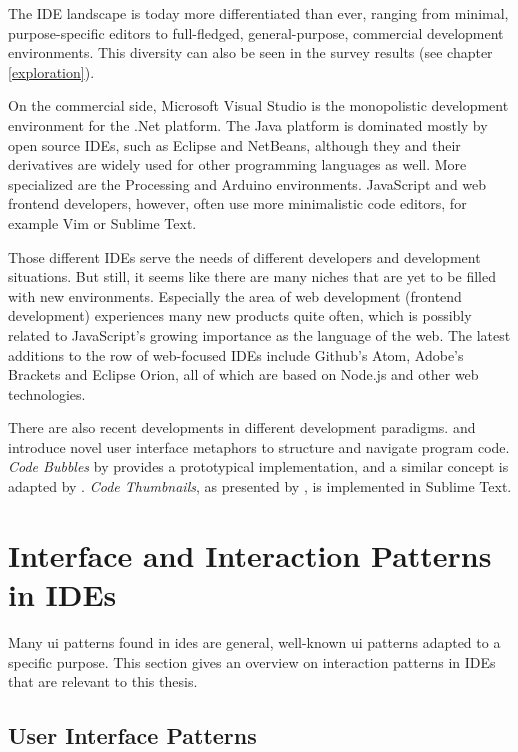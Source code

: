 The IDE landscape is today more differentiated than ever, ranging from
minimal, purpose-specific editors to full-fledged, general-purpose,
commercial development environments. This diversity can also be seen in
the survey results (see chapter \ref{exploration}).

On the commercial side, Microsoft Visual Studio is the monopolistic
development environment for the .Net platform. The Java platform is
dominated mostly by open source IDEs, such as Eclipse and NetBeans,
although they and their derivatives are widely used for other
programming languages as well. More specialized are the Processing and
Arduino environments. JavaScript and web frontend developers, however,
often use more minimalistic code editors, for example Vim or Sublime
Text.

Those different IDEs serve the needs of different developers and
development situations. But still, it seems like there are many niches
that are yet to be filled with new environments. Especially the area of
web development (frontend development) experiences many new products
quite often, which is possibly related to JavaScript’s growing
importance as the language of the web. The latest additions to the row
of web-focused IDEs include Github’s Atom, Adobe’s Brackets and Eclipse
Orion, all of which are based on Node.js and other web technologies.

There are also recent developments in different development paradigms.
 and  introduce novel user
interface metaphors to structure and navigate program code. \emph{Code
Bubbles} by  provides a prototypical implementation,
and a similar concept is adapted by . \emph{Code
Thumbnails}, as presented by , is implemented in
Sublime Text.

\section{Interface and Interaction Patterns in
IDEs}\label{interface-and-interaction-patterns-in-ides}

Many \acl{ui} patterns found in \glspl{ide} are general, well-known
\ac{ui} patterns adapted to a specific purpose. This section gives an
overview on interaction patterns in IDEs that are relevant to this
thesis.

\subsection{User Interface Patterns}\label{user-interface-patterns}


